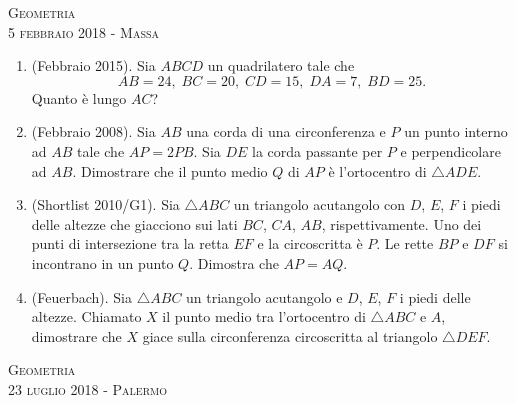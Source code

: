 \documentclass[a4paper]{article}
\theoremstyle{remark}
\theoremstyle{definition}
\begin{document}
\newpage
\begin{center}
	\vspace*{0,5 cm}
	{\Huge \textsc{Geometria}} \\
	\vspace{0,5 cm}
	\textsc{\Author} \hspace{1cm} \textsc{5 febbraio 2018 - Massa}
	\thispagestyle{empty}
	\vspace{0,7 cm}
\end{center}
\normalsize

\begin{enumerate}
	\item (Febbraio 2015).  Sia $ ABCD $ un quadrilatero tale che $$  AB = 24 ,\; BC = 20 ,\; CD = 15 ,\; DA = 7 ,\; BD = 25 . $$ Quanto è lungo $ AC $? 
	
	\item (Febbraio 2008). Sia $ AB $ una corda di una circonferenza e $ P $ un punto interno ad $ AB $ tale che $ AP = 2PB $. Sia $ DE $ la corda passante per $ P $ e perpendicolare ad $ AB $. Dimostrare che il punto medio $ Q $ di $ AP $ è l’ortocentro di $ \bigtriangleup ADE $. 
	
	\item (Shortlist 2010/G1). Sia $\bigtriangleup ABC $ un triangolo acutangolo con $ D $, $ E $, $ F $ i piedi delle altezze che giacciono sui lati $ BC $, $ CA $, $ AB $, rispettivamente. Uno dei punti di intersezione tra la retta $ EF $ e la circoscritta è $ P $. Le rette $ BP $ e $ DF $ si incontrano in un punto $ Q $. Dimostra che $ AP = AQ $.
	
	\item (Feuerbach). Sia $ \bigtriangleup ABC $ un triangolo acutangolo e $ D $, $ E $, $ F $ i piedi delle altezze. Chiamato $ X $ il punto medio tra l'ortocentro di $\bigtriangleup ABC $ e $ A $, dimostrare che $ X $ giace sulla circonferenza circoscritta al triangolo $\bigtriangleup DEF $.
	
	
	
\end{enumerate}

\newpage
\begin{center}
	\vspace*{0,5 cm}
	{\Huge \textsc{Geometria}} \\
	\vspace{0,5 cm}
	\textsc{\Author} \hspace{1cm} \textsc{23 luglio 2018 - Palermo}
	\thispagestyle{empty}
	\vspace{0,7 cm}
\end{center}
\normalsize
\end{document}
